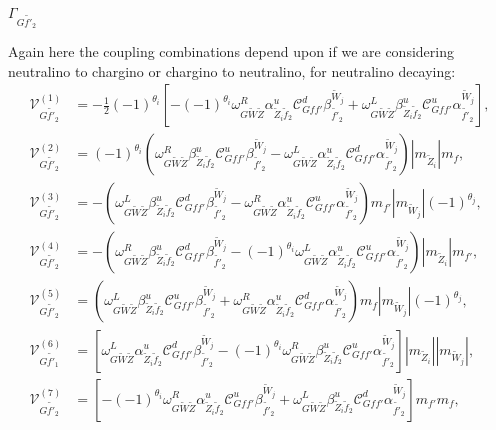 \documentclass[final,3p,times]{elsarticle}
\begin{document}
\textbf{\underline{$\Gamma_{G \tilde{f'}_2}$}}

Again here the coupling combinations depend upon if we are considering neutralino to chargino or chargino to neutralino, for neutralino decaying:
\begin{align}
\mathcal{V}_{G \tilde{f'}_2}^{(1)} &= -\frac{1}{2}(-1)^{\theta_i}[-(-1)^{\theta_i} \omega_{G \tilde{W} \tilde{Z}}^R \alpha_{\tilde{Z}_i \tilde{f}_2}^{u} \mathcal{C}_{G f f'}^d \beta_{\tilde{f'}_2}^{\tilde{W}_j}  + \omega_{G \tilde{W} \tilde{Z}}^L \beta_{\tilde{Z}_i \tilde{f}_2}^{u} \mathcal{C}_{G f f'}^u  \alpha_{\tilde{f'}_2}^{\tilde{W}_j}], \\
\mathcal{V}_{G \tilde{f'}_2}^{(2)} &= (-1)^{\theta_i}(\omega_{G \tilde{W} \tilde{Z}}^R \beta_{\tilde{Z}_i \tilde{f}_2}^{u}  \mathcal{C}_{G f f'}^u \beta_{\tilde{f'}_2}^{\tilde{W}_j} - \omega_{G \tilde{W} \tilde{Z}}^L \alpha_{\tilde{Z}_i \tilde{f}_2}^{u} \mathcal{C}_{G f f'}^d \alpha_{\tilde{f'}_2}^{\tilde{W}_j})|m_{\tilde{Z}_i}|m_{f}, \\
\mathcal{V}_{G \tilde{f'}_2}^{(3)} &= -(\omega_{G \tilde{W} \tilde{Z}}^L \beta_{\tilde{Z}_i \tilde{f}_2}^{u} \mathcal{C}_{G f f'}^d \beta_{\tilde{f'}_2}^{\tilde{W}_j} - \omega_{G \tilde{W} \tilde{Z}}^R \alpha_{\tilde{Z}_i \tilde{f}_2}^{u} \mathcal{C}_{G f f'}^u \alpha_{\tilde{f'}_2}^{\tilde{W}_j})m_{f'}|m_{\tilde{W}_j}|(-1)^{\theta_j}, \\
\mathcal{V}_{G \tilde{f'}_2}^{(4)} &= -(\omega_{G \tilde{W} \tilde{Z}}^R \beta_{\tilde{Z}_i \tilde{f}_2}^{u} \mathcal{C}_{G f f'}^d \beta_{\tilde{f'}_2}^{\tilde{W}_j} - (-1)^{\theta_i} \omega_{G \tilde{W} \tilde{Z}}^L \alpha_{\tilde{Z}_i \tilde{f}_2}^{u} \mathcal{C}_{G f f'}^u \alpha_{\tilde{f'}_2}^{\tilde{W}_j})|m_{\tilde{Z}_i}|m_{f'}, \\
\mathcal{V}_{G \tilde{f'}_2}^{(5)} &= (\omega_{G \tilde{W} \tilde{Z}}^L \beta_{\tilde{Z}_i \tilde{f}_2}^{u} \mathcal{C}_{G f f'}^u \beta_{\tilde{f'}_2}^{\tilde{W}_j} + \omega_{G \tilde{W} \tilde{Z}}^R \alpha_{\tilde{Z}_i \tilde{f}_2}^{u} \mathcal{C}_{G f f'}^d \alpha_{\tilde{f'}_2}^{\tilde{W}_j})m_{f}|m_{\tilde{W}_j}|(-1)^{\theta_j}, \\
\mathcal{V}_{G \tilde{f'}_1}^{(6)} &= [\omega_{G \tilde{W} \tilde{Z}}^L \alpha_{\tilde{Z}_i \tilde{f}_2}^{u} \mathcal{C}_{G f f'}^d \beta_{\tilde{f'}_2}^{\tilde{W}_j} - (-1)^{\theta_i} \omega_{G \tilde{W} \tilde{Z}}^R \beta_{\tilde{Z}_i \tilde{f}_2}^{u} \mathcal{C}_{G f f'}^u \alpha_{\tilde{f'}_2}^{\tilde{W}_j}]|m_{\tilde{Z}_i}||m_{\tilde{W}_j}|, \\
\mathcal{V}_{G \tilde{f'}_2}^{(7)} &= [-(-1)^{\theta_i} \omega_{G \tilde{W} \tilde{Z}}^R \alpha_{\tilde{Z}_i \tilde{f}_2}^{u} \mathcal{C}_{G f f'}^u \beta_{\tilde{f'}_2}^{\tilde{W}_j} + \omega_{G \tilde{W} \tilde{Z}}^L \beta_{\tilde{Z}_i \tilde{f}_2}^{u} \mathcal{C}_{G f f'}^d \alpha_{\tilde{f'}_2}^{\tilde{W}_j}]m_{f'}m_{f}, \\

\end{align}
\end{document}

